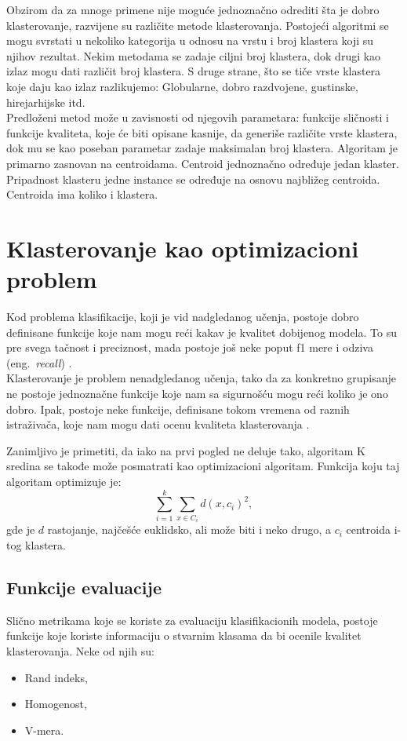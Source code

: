 \documentclass[a4paper,serbian]{symopissr}
\begin{document}
Obzirom da za mnoge primene nije moguće jednoznačno odrediti šta je dobro klasterovanje, razvijene su različite metode klasterovanja.
Postojeći algoritmi se mogu svrstati u nekoliko kategorija u odnosu na vrstu i broj klastera koji su njihov rezultat.
Nekim metodama se zadaje ciljni broj klastera, dok drugi kao izlaz mogu dati različit broj klastera.
S druge strane, što se tiče vrste klastera koje daju kao izlaz razlikujemo: Globularne, dobro razdvojene, gustinske, hirejarhijske itd.\cite{ml_mladen}\\

Predloženi metod može u zavisnosti od njegovih parametara: funkcije sličnosti i funkcije kvaliteta, koje će biti opisane kasnije, da generiše različite vrste klastera, dok mu se kao poseban parametar zadaje maksimalan broj klastera.
Algoritam je primarno zasnovan na centroidama. Centroid jednoznačno određuje jedan klaster. Pripadnost klasteru jedne instance se određuje na osnovu najbližeg centroida. Centroida ima koliko i klastera.

\section{Klasterovanje kao optimizacioni problem}
\label{sec:klasterovanje}
Kod problema klasifikacije, koji je vid nadgledanog učenja, postoje dobro definisane funkcije koje nam mogu reći kakav je kvalitet dobijenog modela. To su pre svega tačnost i preciznost, mada postoje još neke poput f1 mere i odziva (eng.~{\em recall})  \cite{information}.\\

Klasterovanje je problem nenadgledanog učenja,
 tako da za konkretno grupisanje ne postoje jednoznačne funkcije koje nam sa sigurnošću mogu reći koliko je ono dobro. Ipak, postoje neke funkcije, definisane tokom vremena od raznih istraživača, koje nam mogu dati ocenu kvaliteta klasterovanja \cite{db_index}\cite{ch_score}.

Zanimljivo je primetiti, da iako na prvi pogled ne deluje tako, algoritam K sredina se takođe može posmatrati kao optimizacioni algoritam. Funkcija koju taj algoritam optimizuje je:
%
\begin{equation}
\sum_{i=1}^{k}\sum_{x \in C_i} d(x, c_i)^2,
\end{equation}
%
gde je $d$ rastojanje, najčešće euklidsko, ali može biti i neko drugo, a $c_i$ centroida i-tog klastera. 
\subsection{Funkcije evaluacije}
Slično metrikama koje se koriste za evaluaciju klasifikacionih modela, postoje funkcije koje koriste informaciju o stvarnim klasama da bi ocenile kvalitet klasterovanja. Neke od njih su:
\begin{itemize}
	\item Rand indeks,
	\item Homogenost,
	\item V-mera.
\end{itemize}  
\end{document}
